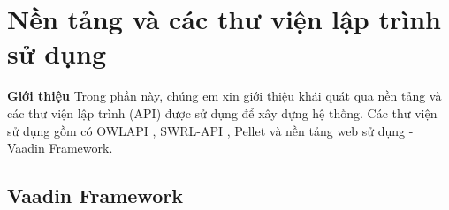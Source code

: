 \section{Nền tảng và các thư viện lập trình sử dụng}
\textbf{Giới thiệu} Trong phần này, chúng em xin giới thiệu khái quát qua nền tảng và các thư viện lập trình (API) được sử dụng để xây dựng hệ thống. Các thư viện sử dụng gồm có OWLAPI \cite{owlapi}, SWRL-API \cite{swrlapi}, Pellet \cite{pellet} và nền tảng web sử dụng - Vaadin Framework.
\subsection{Vaadin Framework }
